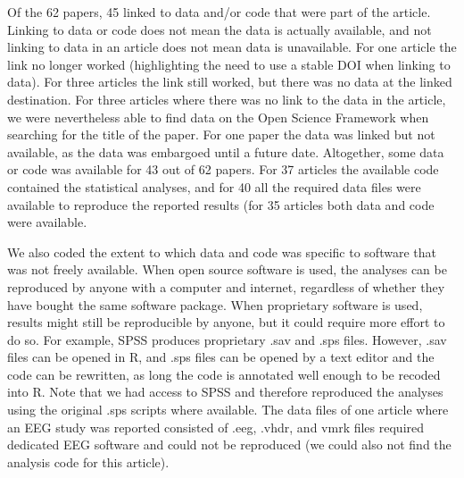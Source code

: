 \documentclass[,jou, a4paper,floatsintext]{apa6}
\begin{document}
Of the 62 papers, 45 linked to data and/or code that were part of the article. Linking to data or code does not mean the data is actually available, and not linking to data in an article does not mean data is unavailable. For one article the link no longer worked (highlighting the need to use a stable DOI when linking to data). For three articles the link still worked, but there was no data at the linked destination. For three articles where there was no link to the data in the article, we were nevertheless able to find data on the Open Science Framework when searching for the title of the paper. For one paper the data was linked but not available, as the data was embargoed until a future date. Altogether, some data or code was available for 43 out of 62 papers. For 37 articles the available code contained the statistical analyses, and for 40 all the required data files were available to reproduce the reported results (for 35 articles both data and code were available.

We also coded the extent to which data and code was specific to software that was not freely available. When open source software is used, the analyses can be reproduced by anyone with a computer and internet, regardless of whether they have bought the same software package. When proprietary software is used, results might still be reproducible by anyone, but it could require more effort to do so. For example, SPSS produces proprietary .sav and .sps files. However, .sav files can be opened in R, and .sps files can be opened by a text editor and the code can be rewritten, as long the code is annotated well enough to be recoded into R. Note that we had access to SPSS and therefore reproduced the analyses using the original .sps scripts where available. The data files of one article where an EEG study was reported consisted of .eeg, .vhdr, and vmrk files required dedicated EEG software and could not be reproduced (we could also not find the analysis code for this article).
\end{document}
